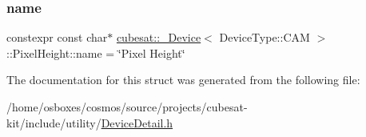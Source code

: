 \subsubsection{\texorpdfstring{name}{name}}
{\footnotesize\ttfamily constexpr const char$\ast$ \hyperlink{structcubesat_1_1__Device}{cubesat\+::\+\_\+\+Device}$<$ Device\+Type\+::\+C\+AM $>$\+::Pixel\+Height\+::name = \char`\"{}Pixel Height\char`\"{}\hspace{0.3cm}{\ttfamily [static]}}



The documentation for this struct was generated from the following file\+:\begin{DoxyCompactItemize}
\item 
/home/osboxes/cosmos/source/projects/cubesat-\/kit/include/utility/\hyperlink{DeviceDetail_8h}{Device\+Detail.\+h}\end{DoxyCompactItemize}
